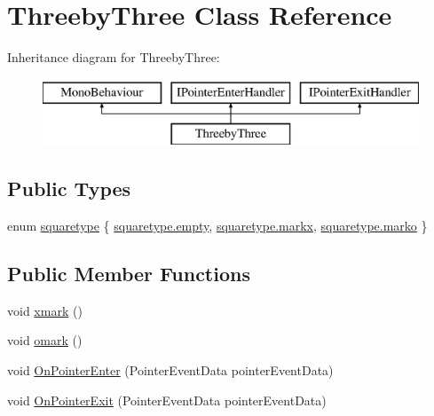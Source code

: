 \hypertarget{class_threeby_three}{}\section{Threeby\+Three Class Reference}
\label{class_threeby_three}
Inheritance diagram for Threeby\+Three\+:\begin{figure}[H]
\begin{center}
\leavevmode
\includegraphics[height=2.000000cm]{class_threeby_three}
\end{center}
\end{figure}
\subsection*{Public Types}
\begin{DoxyCompactItemize}
\item 
enum \mbox{\hyperlink{class_threeby_three_acef42f3cc5d8ffa948e5f800edb7a407}{squaretype}} \{ \mbox{\hyperlink{class_threeby_three_acef42f3cc5d8ffa948e5f800edb7a407aa2e4822a98337283e39f7b60acf85ec9}{squaretype.\+empty}}, 
\mbox{\hyperlink{class_threeby_three_acef42f3cc5d8ffa948e5f800edb7a407a919cbb078fe0f151bb2e13910cfa02bd}{squaretype.\+markx}}, 
\mbox{\hyperlink{class_threeby_three_acef42f3cc5d8ffa948e5f800edb7a407ac28aa76990994587b0e907683792297c}{squaretype.\+marko}}
 \}
\end{DoxyCompactItemize}
\subsection*{Public Member Functions}
\begin{DoxyCompactItemize}
\item 
void \mbox{\hyperlink{class_threeby_three_a876c699e7a88fc53db669a7faed55716}{xmark}} ()
\item 
void \mbox{\hyperlink{class_threeby_three_a3a6fc8840d93aeb8b3f8bce3aba3dcec}{omark}} ()
\item 
void \mbox{\hyperlink{class_threeby_three_a0dc2a10fd5dc7956260a7396eb54a4a6}{On\+Pointer\+Enter}} (Pointer\+Event\+Data pointer\+Event\+Data)
\item 
void \mbox{\hyperlink{class_threeby_three_afb2d068718caafc00d06d5bf87f07692}{On\+Pointer\+Exit}} (Pointer\+Event\+Data pointer\+Event\+Data)
\end{DoxyCompactItemize}
